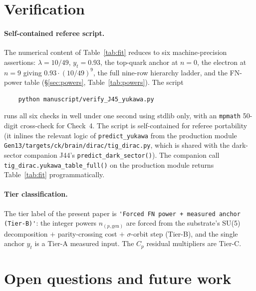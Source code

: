 \documentclass[11pt,reqno]{amsart}
\theoremstyle{plain}
\theoremstyle{definition}
\theoremstyle{remark}
\begin{document}
\section{Verification}\label{sec:verify}

\paragraph{Self-contained referee script.}
The numerical content of Table~\ref{tab:fit} reduces to six
machine-precision assertions: $\lambda = 10/49$, $y_t = 0.93$,
the top-quark anchor at $n=0$, the electron at $n=9$ giving
$0.93\cdot(10/49)^{9}$, the full nine-row hierarchy ladder, and
the FN-power table (\S\ref{sec:powers}, Table~\ref{tab:powers}).
The script
\begin{verbatim}
    python manuscript/verify_J45_yukawa.py
\end{verbatim}
runs all six checks in well under one second using stdlib only,
with an \texttt{mpmath} 50-digit cross-check for Check~4. The
script is self-contained for referee portability (it inlines
the relevant logic of \texttt{predict\_yukawa} from the
production module
\texttt{Gen13/targets/ck/brain/dirac/tig\_dirac.py}, which is
shared with the dark-sector companion J44's
\texttt{predict\_dark\_sector()}). The companion call
\texttt{tig\_dirac.yukawa\_table\_full()} on the production
module returns Table~\ref{tab:fit} programmatically.

\paragraph{Tier classification.}
The tier label of the present paper is
\verb|'Forced FN power + measured anchor (Tier-B)'|: the
integer powers $n_{(p,\mathrm{gen})}$ are forced from the
substrate's SU(5) decomposition $+$ parity-crossing cost $+$
$\sigma$-orbit step (Tier-B), and the single anchor $y_{t}$
is a Tier-A measured input. The $C_p$ residual multipliers
are Tier-C.

\section{Open questions and future work}\label{sec:open}
\end{document}
